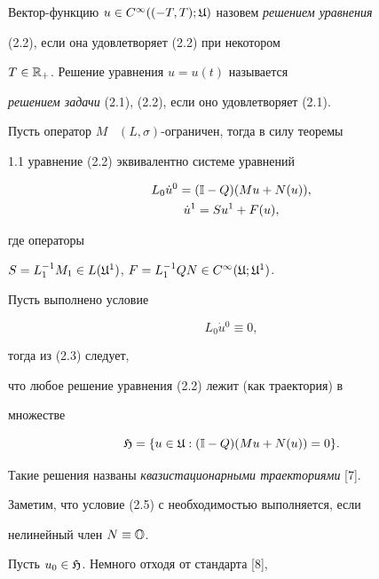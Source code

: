 Вектор-функцию $u\in


C^{\infty}((-T,T);\frak U)$ назовем {\it решением уравнения}


(2.2), если она удовлетворяет (2.2) при некотором 


$T\in\Bbb R_{+}$. Решение уравнения $u=u(t)$ называется


{\it решением задачи} (2.1), (2.2), если оно удовлетворяет (2.1).





Пусть оператор $M$ \ $(L,\sigma)$-ограничен, тогда в силу теоремы


1.1 уравнение (2.2) эквивалентно системе уравнений


\begin{gather}


L_{0}\Dot u{}^{0}=(\Bbb I-Q)(Mu+N(u)),\\


\Dot u{}^{1}=Su^{1}+F(u),


\end{gather}


где операторы


$S=L^{-1}_{1}M_{1}\in L(\frak U^{1})$, $F=L^{-1}_{1}QN\in


C^{\infty}(\frak U;\frak U^{1})$. 





Пусть выполнено условие


\begin{equation}


L_{0}\Dot u{}^{0}\equiv 0,


\end{equation}


тогда из (2.3) следует,


что любое решение уравнения (2.2) лежит (как траектория) в


множестве


$$


\frak H=\{u\in\frak U:(\Bbb I-Q)(Mu+N(u))=0\}.


$$


Такие решения названы {\it квазистационарными траекториями} [7].


Заметим, что условие (2.5) с необходимостью выполняется, если


нелинейный член $N\equiv\Bbb O$.





Пусть $u_{0}\in\frak H$. Немного отходя от стандарта [8],


